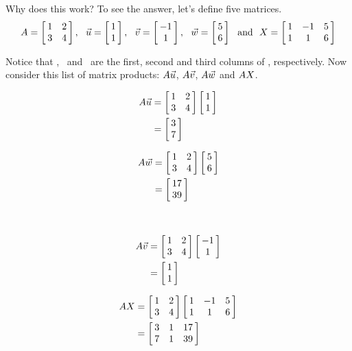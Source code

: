 Why does this work? To see the answer, let's define five matrices. $$\tta = \bmx{cc}1&2\\3&4\emx, \ \ \vu =\bmx{c}1\\1\emx, \ \ \vv =\bmx{c}-1\\1\emx, \ \ \vw = \bmx{c} 5\\6\emx \ \ \text{and} \ \ \ttx = \bmx{ccc}1&-1&5\\1&1&6\emx$$

Notice that \vu, \vv\ and \vw\ are the first, second and third columns of \ttx, respectively. Now consider this list of matrix products: $\tta\vu$, $\tta\vv$, $\tta\vw$ and $\tta\ttx$.

\begin{center}
\begin{minipage}{100pt}
\begin{align*}
	\tta\vu &= \bmx{cc}1&2\\3&4\emx\bmx{c}1\\1\emx\\
					&= \bmx{c}3\\7\emx\end{align*}
					
\begin{align*}
	\tta\vw	&= \bmx{cc}1&2\\3&4\emx\bmx{c}5\\6\emx\\
					&= \bmx{c}17\\39\emx\end{align*}
\end{minipage}
\begin{minipage}{20pt}
\
\end{minipage}
\begin{minipage}{100pt}
\begin{align*}
	\tta\vv &= \bmx{cc}1&2\\3&4\emx\bmx{c}-1\\1\emx\\
					&= \bmx{c}1\\1\emx\end{align*}
					
\begin{align*}
	\tta\ttx	&= \bmx{cc}1&2\\3&4\emx\bmx{ccc}1&-1&5\\1&1&6\emx\\
					&= \bmx{ccc}3&1&17\\7&1&39\emx\end{align*}
\end{minipage}
\end{center}


